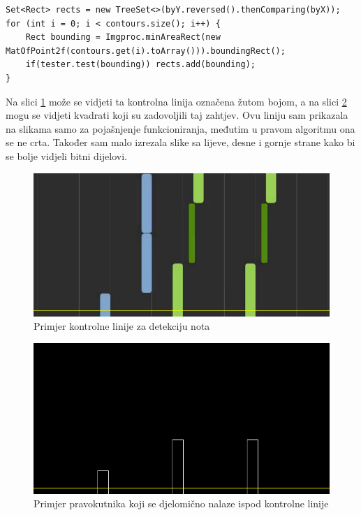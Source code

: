 \documentclass[times, utf8, zavrsni, numeric]{fer}
\begin{document}
\begin{lstlisting}
Set<Rect> rects = new TreeSet<>(byY.reversed().thenComparing(byX));
for (int i = 0; i < contours.size(); i++) {
	Rect bounding = Imgproc.minAreaRect(new MatOfPoint2f(contours.get(i).toArray())).boundingRect();
	if(tester.test(bounding)) rects.add(bounding);
}
\end{lstlisting}

Na slici \ref{fig:controly} može se vidjeti ta kontrolna linija označena žutom bojom, a na slici \ref{fig:controlyrect} mogu se vidjeti kvadrati koji su zadovoljili taj zahtjev. Ovu liniju sam prikazala na slikama samo za pojašnjenje funkcioniranja, međutim u pravom algoritmu ona se ne crta. Također sam malo izrezala slike sa lijeve, desne i gornje strane kako bi se bolje vidjeli bitni dijelovi.

\begin{figure}[h]
	\includegraphics[scale=0.6]{controlycrop.png}
	\centering
	\caption{Primjer kontrolne linije za detekciju nota}
	\label{fig:controly}
\end{figure}

\begin{figure}[h]
	\includegraphics[scale=0.6]{controlyrectcrop.png}
	\centering
	\caption{Primjer pravokutnika koji se djelomično nalaze ispod kontrolne linije}
	\label{fig:controlyrect}
\end{figure}
\end{document}
